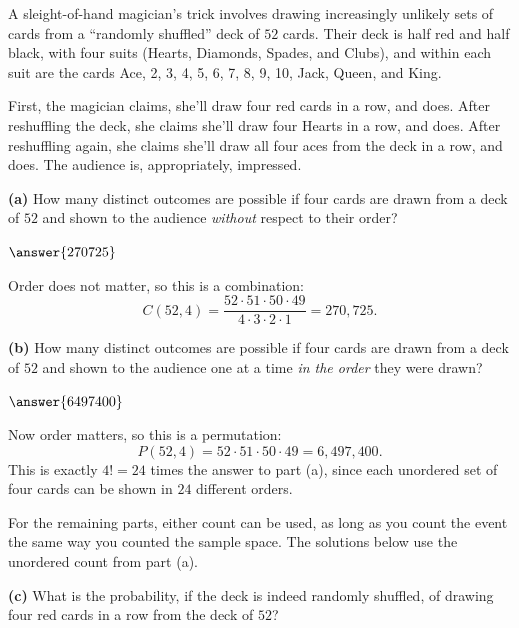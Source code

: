 \documentclass[12pt]{ximera}
\begin{document}
\begin{problem}
A sleight-of-hand magician's trick involves drawing increasingly unlikely sets of
cards from a ``randomly shuffled'' deck of $52$ cards. Their deck is half red and
half black, with four suits (Hearts, Diamonds, Spades, and Clubs), and within each
suit are the cards Ace, 2, 3, 4, 5, 6, 7, 8, 9, 10, Jack, Queen, and King.

First, the magician claims, she'll draw four red cards in a row, and does. After
reshuffling the deck, she claims she'll draw four Hearts in a row, and does. After
reshuffling again, she claims she'll draw all four aces from the deck in a row, and
does. The audience is, appropriately, impressed.

\begin{prompt}
\textbf{(a)} How many distinct outcomes are possible if four cards are drawn from a
deck of $52$ and shown to the audience \emph{without} respect to their order?

$\answer{270725}$

\begin{feedback}
Order does not matter, so this is a combination:
\[
C(52,4)=\frac{52\cdot 51\cdot 50\cdot 49}{4\cdot 3\cdot 2\cdot 1}=270{,}725.
\]
\end{feedback}
\end{prompt}

\begin{prompt}
\textbf{(b)} How many distinct outcomes are possible if four cards are drawn from a
deck of $52$ and shown to the audience one at a time \emph{in the order} they were
drawn?

$\answer{6497400}$

\begin{feedback}
Now order matters, so this is a permutation:
\[
P(52,4)=52\cdot 51\cdot 50\cdot 49 = 6{,}497{,}400.
\]
This is exactly $4!=24$ times the answer to part (a), since each unordered set of
four cards can be shown in $24$ different orders.
\end{feedback}
\end{prompt}

For the remaining parts, either count can be used, as long as you count the event the
same way you counted the sample space. The solutions below use the unordered count
from part (a).

\begin{prompt}
\textbf{(c)} What is the probability, if the deck is indeed randomly shuffled, of
drawing four red cards in a row from the deck of $52$?


\end{prompt}
\end{problem}
\end{document}
